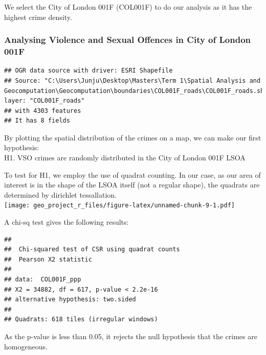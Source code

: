 \documentclass[]{article}
\theoremstyle{definition}
\theoremstyle{definition}
\theoremstyle{definition}
\theoremstyle{remark}
\begin{document}
We select the City of London 001F (COL001F) to do our analysis as it has
the highest crime density.

\subsubsection{Analysing Violence and Sexual Offences in City of London
001F}\label{analysing-violence-and-sexual-offences-in-city-of-london-001f}

\begin{verbatim}
## OGR data source with driver: ESRI Shapefile 
## Source: "C:\Users\Junju\Desktop\Masters\Term 1\Spatial Analysis and Geocomputation\Geocomputation\boundaries\COL001F_roads\COL001F_roads.shp", layer: "COL001F_roads"
## with 4303 features
## It has 8 fields
\end{verbatim}

By plotting the spatial distribution of the crimes on a map, we can make
our first hypothesis:\\
H1. VSO crimes are randomly distributed in the City of London 001F LSOA

To test for H1, we employ the use of quadrat counting. In our case, as
our area of interest is in the shape of the LSOA itself (not a regular
shape), the quadrats are determined by dirichlet tessallation.\\
\texttt{[image: geo\_project\_r\_files/figure-latex/unnamed-chunk-9-1.pdf]}

A chi-sq test gives the following results:

\begin{verbatim}
## 
##  Chi-squared test of CSR using quadrat counts
##  Pearson X2 statistic
## 
## data:  COL001F_ppp
## X2 = 34882, df = 617, p-value < 2.2e-16
## alternative hypothesis: two.sided
## 
## Quadrats: 618 tiles (irregular windows)
\end{verbatim}

As the p-value is less than 0.05, it rejects the null hypothesis that
the crimes are homogeneous.
\end{document}
